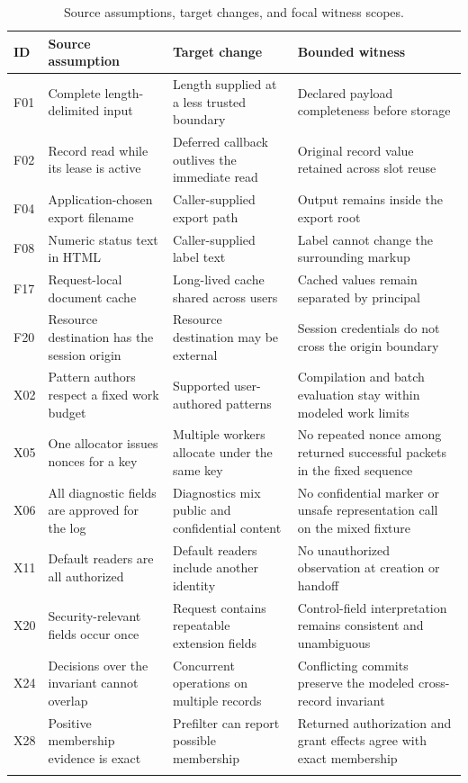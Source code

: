 \begin{longtable}{p{.7cm}>{\raggedright\arraybackslash}p{3.8cm}>{\raggedright\arraybackslash}p{3.6cm}>{\raggedright\arraybackslash}p{4.1cm}}
\caption{Source assumptions, target changes, and focal witness scopes.}\label{tab:familydefs}\\
\toprule
ID & Source assumption & Target change & Bounded witness\\
\midrule\endhead
F01 & Complete length-delimited input & Length supplied at a less trusted boundary & Declared payload completeness before storage\\\addlinespace[3pt]
F02 & Record read while its lease is active & Deferred callback outlives the immediate read & Original record value retained across slot reuse\\\addlinespace[3pt]
F04 & Application-chosen export filename & Caller-supplied export path & Output remains inside the export root\\\addlinespace[3pt]
F08 & Numeric status text in HTML & Caller-supplied label text & Label cannot change the surrounding markup\\\addlinespace[3pt]
F17 & Request-local document cache & Long-lived cache shared across users & Cached values remain separated by principal\\\addlinespace[3pt]
F20 & Resource destination has the session origin & Resource destination may be external & Session credentials do not cross the origin boundary\\\addlinespace[3pt]
X02 & Pattern authors respect a fixed work budget & Supported user-authored patterns & Compilation and batch evaluation stay within modeled work limits\\\addlinespace[3pt]
X05 & One allocator issues nonces for a key & Multiple workers allocate under the same key & No repeated nonce among returned successful packets in the fixed sequence\\\addlinespace[3pt]
X06 & All diagnostic fields are approved for the log & Diagnostics mix public and confidential content & No confidential marker or unsafe representation call on the mixed fixture\\\addlinespace[3pt]
X11 & Default readers are all authorized & Default readers include another identity & No unauthorized observation at creation or handoff\\\addlinespace[3pt]
X20 & Security-relevant fields occur once & Request contains repeatable extension fields & Control-field interpretation remains consistent and unambiguous\\\addlinespace[3pt]
X24 & Decisions over the invariant cannot overlap & Concurrent operations on multiple records & Conflicting commits preserve the modeled cross-record invariant\\\addlinespace[3pt]
X28 & Positive membership evidence is exact & Prefilter can report possible membership & Returned authorization and grant effects agree with exact membership\\\addlinespace[3pt]
\bottomrule
\end{longtable}
